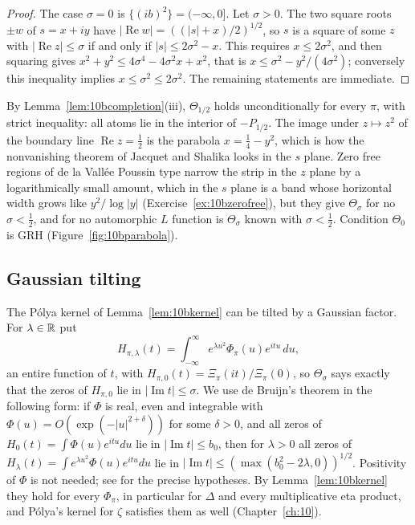\begin{proof}
The case $\sigma=0$ is $\{(ib)^2\} = (-\infty,0]$. Let $\sigma>0$. The two square roots $\pm w$ of $s = x+iy$ have $|\operatorname{Re}w| = ((|s|+x)/2)^{1/2}$, so $s$ is a square of some $z$ with $|\operatorname{Re}z|\le\sigma$ if and only if $|s|\le2\sigma^2-x$. This requires $x\le2\sigma^2$, and then squaring gives $x^2+y^2\le4\sigma^4-4\sigma^2x+x^2$, that is $x\le\sigma^2-y^2/(4\sigma^2)$; conversely this inequality implies $x\le\sigma^2\le2\sigma^2$. The remaining statements are immediate.
\end{proof}

By Lemma~\ref{lem:10bcompletion}(iii), $\Theta_{1/2}$ holds unconditionally for every $\pi$, with strict inequality: all atoms lie in the interior of $-P_{1/2}$. The image under $z\mapsto z^2$ of the boundary line $\operatorname{Re}z=\frac12$ is the parabola $x = \frac14-y^2$, which is how the nonvanishing theorem of Jacquet and Shalika looks in the $s$ plane. Zero free regions of de la Vall\'ee Poussin type \cite{iwanieckowalski2004} narrow the strip in the $z$ plane by a logarithmically small amount, which in the $s$ plane is a band whose horizontal width grows like $y^2/\log|y|$ (Exercise~\ref{ex:10bzerofree}), but they give $\Theta_\sigma$ for no $\sigma<\frac12$, and for no automorphic $L$ function is $\Theta_\sigma$ known with $\sigma<\frac12$. Condition $\Theta_0$ is GRH (Figure~\ref{fig:10bparabola}).

\subsection{Gaussian tilting}

The P\'olya kernel of Lemma~\ref{lem:10bkernel} can be tilted by a Gaussian factor. For $\lambda\in\mathbb{R}$ put
\[
H_{\pi,\lambda}(t) = \int_{-\infty}^\infty e^{\lambda u^2}\Phi_\pi(u)e^{itu}\,du,
\]
an entire function of $t$, with $H_{\pi,0}(t) = \Xi_\pi(it)/\Xi_\pi(0)$, so $\Theta_\sigma$ says exactly that the zeros of $H_{\pi,0}$ lie in $|\operatorname{Im}t|\le\sigma$. We use de Bruijn's theorem \cite{debruijn1950} in the following form: if $\Phi$ is real, even and integrable with $\Phi(u) = O(\exp(-|u|^{2+\delta}))$ for some $\delta>0$, and all zeros of $H_0(t) = \int\Phi(u)e^{itu}du$ lie in $|\operatorname{Im}t|\le b_0$, then for $\lambda>0$ all zeros of $H_\lambda(t) = \int e^{\lambda u^2}\Phi(u)e^{itu}du$ lie in $|\operatorname{Im}t|\le(\max(b_0^2-2\lambda,0))^{1/2}$. Positivity of $\Phi$ is not needed; see \cite{debruijn1950,newman1976} for the precise hypotheses. By Lemma~\ref{lem:10bkernel} they hold for every $\Phi_\pi$, in particular for $\Delta$ and every multiplicative eta product, and P\'olya's kernel for $\zeta$ satisfies them as well (Chapter~\ref{ch:10}).

